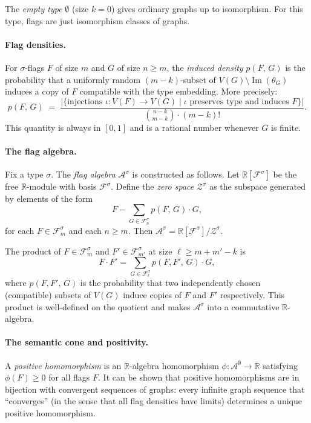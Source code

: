 \documentclass{article}
\newcommand{\R}{\mathbb{R}}
\newcommand{\Flag}[1]{\mathcal{F}^{#1}}
\newcommand{\FlagAlg}[1]{\mathcal{A}^{#1}}
\newcommand{\den}[2]{p(#1,\,#2)}
\begin{document}
The \emph{empty type} $\emptyset$ (size $k=0$) gives ordinary graphs up to
isomorphism.  For this type, flags are just isomorphism classes of graphs.

\paragraph{Flag densities.}
For $\sigma$-flags $F$ of size $m$ and $G$ of size $n \geq m$, the
\emph{induced density} $\den{F}{G}$ is the probability that a uniformly random
$(m - k)$-subset of $V(G) \setminus \operatorname{Im}(\theta_G)$ induces a
copy of $F$ compatible with the type embedding.  More precisely:
\[
  \den{F}{G} \;=\;
  \frac{\bigl|\{\text{injections } \iota : V(F) \to V(G) \mid \iota \text{ preserves type and induces } F\}\bigr|}
       {\binom{n-k}{m-k} \cdot (m-k)!}.
\]
This quantity is always in $[0,1]$ and is a rational number whenever $G$ is
finite.

\paragraph{The flag algebra.}
Fix a type $\sigma$.  The \emph{flag algebra} $\FlagAlg{\sigma}$ is
constructed as follows.  Let $\mathbb{R}[\Flag{\sigma}]$ be the free
$\R$-module with basis $\Flag{\sigma}$.  Define the \emph{zero space}
$\mathcal{Z}^\sigma$ as the subspace generated by elements of the form
\[
  F - \sum_{G \in \Flag{\sigma}_n} \den{F}{G} \cdot G,
\]
for each $F \in \Flag{\sigma}_m$ and each $n \geq m$.  Then
$\FlagAlg{\sigma} = \mathbb{R}[\Flag{\sigma}] / \mathcal{Z}^\sigma$.

The product of $F \in \Flag{\sigma}_m$ and $F' \in \Flag{\sigma}_{m'}$ at size
$\ell \geq m + m' - k$ is
\[
  F \cdot F' = \sum_{G \in \Flag{\sigma}_\ell} \den{F,F'}{G} \cdot G,
\]
where $\den{F,F'}{G}$ is the probability that two independently chosen
(compatible) subsets of $V(G)$ induce copies of $F$ and $F'$ respectively.
This product is well-defined on the quotient and makes $\FlagAlg{\sigma}$ into
a commutative $\R$-algebra.

\paragraph{The semantic cone and positivity.}
A \emph{positive homomorphism} is an $\R$-algebra homomorphism
$\phi : \FlagAlg{\emptyset} \to \R$ satisfying $\phi(F) \geq 0$ for all
flags $F$.  It can be shown that positive homomorphisms are in bijection with
convergent sequences of graphs: every infinite graph sequence that
``converges'' (in the sense that all flag densities have limits) determines a
unique positive homomorphism.
\end{document}
